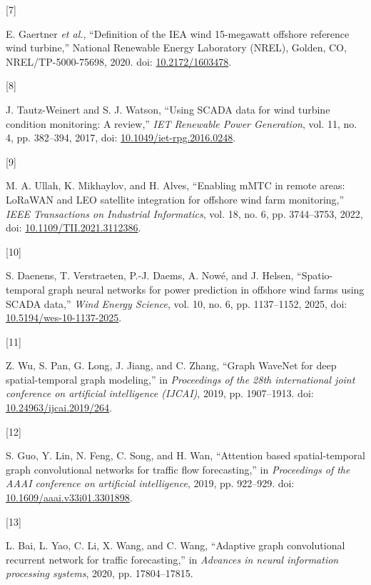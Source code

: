 \documentclass[
  journal]{IEEEtran}
\newlength{\cslhangindent}
\newlength{\csllabelwidth}
\newenvironment{CSLReferences}[2] %
 {\begin{list}{}{%
  \setlength{\itemindent}{0pt}
  \setlength{\leftmargin}{0pt}
  \setlength{\parsep}{0pt}
  \ifodd #1
   \setlength{\leftmargin}{\cslhangindent}
   \setlength{\itemindent}{-1\cslhangindent}
  \fi
  \setlength{\itemsep}{#2\baselineskip}}}
 {\end{list}}
\newcommand{\CSLLeftMargin}[1]{\parbox[t]{\csllabelwidth}{\strut#1\strut}}
\newcommand{\CSLRightInline}[1]{\parbox[t]{\linewidth - \csllabelwidth}{\strut#1\strut}}
\begin{document}
\begin{CSLReferences}{0}{0}
\CSLLeftMargin{{[}7{]} }%
\CSLRightInline{E. Gaertner \emph{et al.}, {``Definition of the {IEA}
wind 15-megawatt offshore reference wind turbine,''} National Renewable
Energy Laboratory (NREL), Golden, CO, NREL/TP-5000-75698, 2020. doi:
\href{https://doi.org/10.2172/1603478}{10.2172/1603478}.}

\CSLLeftMargin{{[}8{]} }%
\CSLRightInline{J. Tautz-Weinert and S. J. Watson, {``Using SCADA data
for wind turbine condition monitoring: A review,''} \emph{IET Renewable
Power Generation}, vol. 11, no. 4, pp. 382--394, 2017, doi:
\href{https://doi.org/10.1049/iet-rpg.2016.0248}{10.1049/iet-rpg.2016.0248}.}

\CSLLeftMargin{{[}9{]} }%
\CSLRightInline{M. A. Ullah, K. Mikhaylov, and H. Alves, {``Enabling
{mMTC} in remote areas: {LoRaWAN} and {LEO} satellite integration for
offshore wind farm monitoring,''} \emph{IEEE Transactions on Industrial
Informatics}, vol. 18, no. 6, pp. 3744--3753, 2022, doi:
\href{https://doi.org/10.1109/TII.2021.3112386}{10.1109/TII.2021.3112386}.}

\CSLLeftMargin{{[}10{]} }%
\CSLRightInline{S. Daenens, T. Verstraeten, P.-J. Daems, A. Nowé, and J.
Helsen, {``Spatio-temporal graph neural networks for power prediction in
offshore wind farms using SCADA data,''} \emph{Wind Energy Science},
vol. 10, no. 6, pp. 1137--1152, 2025, doi:
\href{https://doi.org/10.5194/wes-10-1137-2025}{10.5194/wes-10-1137-2025}.}

\CSLLeftMargin{{[}11{]} }%
\CSLRightInline{Z. Wu, S. Pan, G. Long, J. Jiang, and C. Zhang, {``Graph
WaveNet for deep spatial-temporal graph modeling,''} in
\emph{Proceedings of the 28th international joint conference on
artificial intelligence (IJCAI)}, 2019, pp. 1907--1913. doi:
\href{https://doi.org/10.24963/ijcai.2019/264}{10.24963/ijcai.2019/264}.}

\CSLLeftMargin{{[}12{]} }%
\CSLRightInline{S. Guo, Y. Lin, N. Feng, C. Song, and H. Wan,
{``Attention based spatial-temporal graph convolutional networks for
traffic flow forecasting,''} in \emph{Proceedings of the AAAI conference
on artificial intelligence}, 2019, pp. 922--929. doi:
\href{https://doi.org/10.1609/aaai.v33i01.3301898}{10.1609/aaai.v33i01.3301898}.}

\CSLLeftMargin{{[}13{]} }%
\CSLRightInline{L. Bai, L. Yao, C. Li, X. Wang, and C. Wang, {``Adaptive
graph convolutional recurrent network for traffic forecasting,''} in
\emph{Advances in neural information processing systems}, 2020, pp.
17804--17815.}


\end{CSLReferences}
\end{document}
